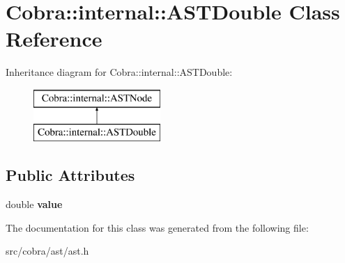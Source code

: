 \hypertarget{class_cobra_1_1internal_1_1_a_s_t_double}{\section{Cobra\+:\+:internal\+:\+:A\+S\+T\+Double Class Reference}
\label{class_cobra_1_1internal_1_1_a_s_t_double}
}
Inheritance diagram for Cobra\+:\+:internal\+:\+:A\+S\+T\+Double\+:\begin{figure}[H]
\begin{center}
\leavevmode
\includegraphics[height=2.000000cm]{class_cobra_1_1internal_1_1_a_s_t_double}
\end{center}
\end{figure}
\subsection*{Public Attributes}
\begin{DoxyCompactItemize}
\item 
\hypertarget{class_cobra_1_1internal_1_1_a_s_t_double_adb8d73d965bffb93e8caab014e3f1241}{double {\bfseries value}}\label{class_cobra_1_1internal_1_1_a_s_t_double_adb8d73d965bffb93e8caab014e3f1241}

\end{DoxyCompactItemize}


The documentation for this class was generated from the following file\+:\begin{DoxyCompactItemize}
\item 
src/cobra/ast/ast.\+h\end{DoxyCompactItemize}
